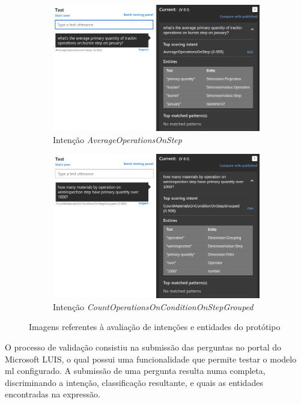 \begin{figure}
\begin{subfigure}[t]{.48\textwidth}
     \end{subfigure}
     \bigbreak
     \begin{subfigure}[t]{.48\textwidth}
        \centering
        \includegraphics[width=\textwidth]{ch06/assets/nlcomprehension03.png}
        \caption{Intenção \textit{AverageOperationsOnStep}}
     \end{subfigure}
     \begin{subfigure}[t]{.48\textwidth}
        \centering
        \includegraphics[width=\textwidth]{ch06/assets/nlcomprehension04.png}
        \caption{Intenção \textit{CountOperationsOnConditionOnStepGrouped}}
     \end{subfigure}
\caption{Imagens referentes à avaliação de intenções e entidades do protótipo}
\label{fig:nlcomprehesion}
\end{figure}

O processo de validação consistiu na submissão das perguntas no portal do Microsoft LUIS, o qual possui uma funcionalidade que permite testar o modelo \gls{ml} configurado. A submissão de uma pergunta resulta numa  completa, discriminando a intenção, classificação resultante, e quais as entidades encontradas na expressão.

